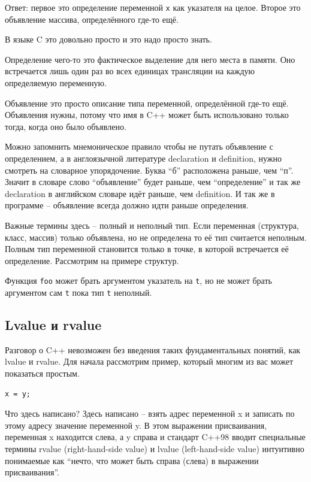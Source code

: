\documentclass[a4paper,12pt,oneside]{article}
\begin{document}
Ответ: первое это определение переменной \lstinline!x! как указателя на целое. Второе это объявление массива, определённого где-то ещё.

В языке C это довольно просто и это надо просто знать.

Определение чего-то это фактическое выделение для него места в памяти. Оно встречается лишь один раз во всех единицах трансляции на каждую определяемую переменную.

Объявление это просто описание типа переменной, определённой где-то ещё. Объявления нужны, потому что имя в C++ может быть использовано только тогда, когда оно было объявлено.

Можно запомнить мнемоническое правило чтобы не путать объявление с определением, а в англоязычной литературе declaration и definition, нужно смотреть на словарное упорядочение.  Буква ``б'' расположена раньше, чем ``п''. Значит в словаре слово ``объявление'' будет раньше, чем ``определение'' и так же declaration в английском словаре идёт раньше, чем definition. И так же в программе – объявление всегда должно идти раньше определения.

Важные термины здесь – полный и неполный тип. Если переменная (структура, класс, массив) только объявлена, но не определена то её тип считается неполным. Полным тип переменной становится только в точке, в которой встречается её определение. Рассмотрим на примере структур.



Функция \lstinline!foo! может брать аргументом указатель на \lstinline!t!, но не может брать аргументом сам \lstinline!t! пока тип \lstinline!t! неполный.

\subsection{Lvalue и rvalue}

Разговор о C++ невозможен без введения таких фундаментальных понятий, как lvalue и rvalue. Для начала рассмотрим пример, который многим из вас может показаться простым.

\begin{lstlisting}
x = y;
\end{lstlisting}

Что здесь написано? Здесь написано – взять адрес переменной x и записать по этому адресу значение переменной y. В этом выражении присваивания, переменная x находится слева, а y справа и стандарт C++98 вводит специальные термины rvalue (right-hand-side value) и lvalue (left-hand-side value) интуитивно понимаемые как ``нечто, что может быть справа (слева) в выражении присваивания''. 
\end{document}
